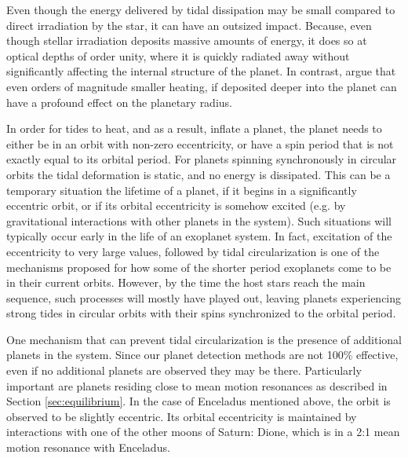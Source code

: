 Even though the energy delivered by tidal dissipation may be small compared to
direct irradiation by the star, it can have an outsized impact. Because, even
though stellar irradiation deposits massive amounts of energy, it does so at
optical depths of order unity, where it is quickly radiated away without
significantly affecting the internal structure of the planet. In contrast,
\citet{Komacek_Youdin_17} argue that even orders of magnitude smaller heating,
if deposited deeper into the planet can have a profound effect on the planetary
radius.

In order for tides to heat, and as a result, inflate a planet, the planet needs
to either be in an orbit with non-zero eccentricity, or have a spin period that
is not exactly equal to its orbital period. For planets spinning synchronously
in circular orbits the tidal deformation is static, and no energy is dissipated.
This can be a temporary situation the lifetime of a planet, if it begins in a
significantly eccentric orbit, or if its orbital eccentricity is somehow excited
(e.g. by gravitational interactions with other planets in the system). Such
situations will typically occur early in the life of an exoplanet system. In
fact, excitation of the eccentricity to very large values, followed by tidal
circularization is one of the mechanisms proposed for how some of the shorter
period exoplanets come to be in their current orbits. However, by the time the
host stars reach the main sequence, such processes will mostly have played out,
leaving planets experiencing strong tides in circular orbits with their spins
synchronized to the orbital period.

One mechanism that can prevent tidal circularization is the presence of
additional planets in the system. Since our planet detection methods are not
100\% effective, even if no additional planets are observed they may be there.
Particularly important are planets residing close to mean motion resonances as
described in Section \ref{sec:equilibrium}. In the case of Enceladus mentioned
above, the orbit is observed to be slightly eccentric. Its orbital eccentricity
is maintained by interactions with one of the other moons of Saturn: Dione,
which is in a 2:1 mean motion resonance with Enceladus.

